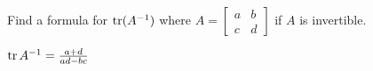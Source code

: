 
\begin{Exercise}[
name={},
title={}, 
difficulty=0,
origin={\cite{YL}}]
Find a formula for $\operatorname{tr}(A^{-1})$ where $A=\begin{bmatrix}a&b\\c&d\end{bmatrix}$ if $A$ is invertible.
\end{Exercise}

\begin{Answer}
$\operatorname{tr}{A^{-1}}=\frac{a+d}{ad-bc}$
\end{Answer}
